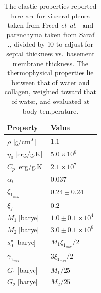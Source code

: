 \begin{table}
    \centering
    \caption{The elastic properties reported here are for visceral pleura taken from Freed \textit{et~al}.\ \cite{Freedetal17} and parenchyma taken from Saraf ., \cite{Sarafetal07} divided by 10 to adjust for septal thickness vs.\ basement membrane thickness.  The thermo\-physical properties lie between that of water and collagen, weighted toward that of water, and evaluated at body temperature.}
    \label{tableVisceralPleura}
    \footnotesize
    \begin{tabular}{ll}
        \hline
        \textbf{Property} & \textbf{Value} \\ \hline
        $\rho$ \hfill [$\textrm{g/cm}^{3^{\phantom{|}}}$] & $1.1$ \\
        $\eta_0$ \hfill [erg/g.K] & $5.0 \times 10^6$ \\
        $C_p$ \hfill [erg/g.K] & $2.1 \times 10^7$ \\
        $\alpha_t$ & $0.037$ \\ \hline
        $\xi_{1_{\max}}$ & $0.24 \pm 0.24$ \\
        $\xi_f$ & $0.2$ \\
        $M_1$ \hfill [barye] & $1.0 \pm 0.1 \times 10^4$ \\
        $M_2$ \hfill [barye] & $3.0 \pm 0.1 \times 10^6$ \\
        $s^{\pi}_0$ \hfill [barye] & $M_1 \xi_{1_{\max}} / 2$ \\ \hline
        $\gamma_{1_{\max}}$ & $3 \xi_{1_{\max}} / 2$ \\
        $G_1$ \hfill [barye] & $M_1 / 25$ \\
        $G_2$ \hfill [barye] & $M_2 / 25$ \\ \hline
    \end{tabular}
\end{table}

